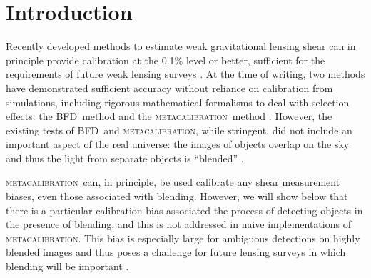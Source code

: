 \documentclass[fleqn,useAMS,usenatbib]{mnras}
\newcommand{\mcal}{\textsc{metacalibration}}
\newcommand{\mdet}{\textsc{metadetection}}
\newcommand{\bfd}{\textsc{BFD}}
\begin{document}
\begin{abstract}



\end{abstract}

\section{Introduction}

Recently developed methods to estimate weak gravitational lensing shear can in
principle provide calibration at the 0.1\% level or better, sufficient for the
requirements of future weak lensing surveys \citep[e.g.,][]{huterer2006}.  At
the time of writing, two methods have demonstrated sufficient accuracy without
reliance on calibration from simulations, including rigorous mathematical
formalisms to deal with selection effects:  the \bfd\ method
\citep{BernBFD2016} and the \mcal\ method \citep{HuffMcal2017,SheldonMcal2017}.
However, the existing tests of \bfd\ and \mcal, while stringent, did not
include an important aspect of the real universe: the images of objects overlap
on the sky and thus the light from separate objects is ``blended'' \citep[for
discussion of blending effects see, e.g.,][]{DawsonBlending2016}.


\mcal\ can, in principle, be used calibrate any shear measurement biases, even
those associated with blending.  However, we will show below that there is a
particular calibration bias associated the process of detecting objects in the
presence of blending, and this is not addressed in naive implementations of
\mcal. This bias is especially large for ambiguous detections on highly blended
images and thus poses a challenge for future lensing surveys in which
blending will be important \citep{DawsonBlending2016}.
\end{document}
